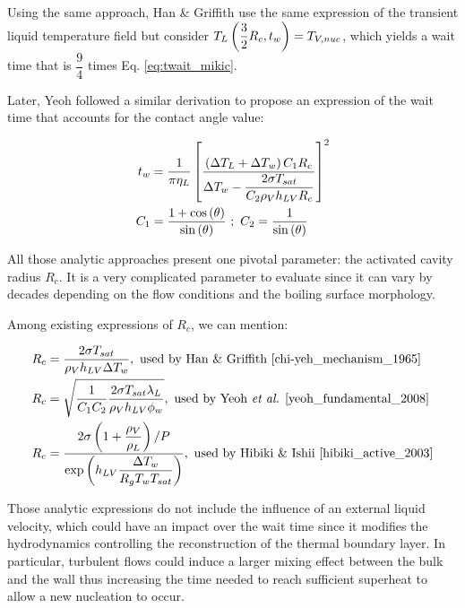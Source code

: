Using the same approach, Han \& Griffith \cite{chi-yeh_mechanism_1965} use the same expression of the transient liquid temperature field but consider $T_{L}\left( \dfrac{3}{2}R_{c},t_{w} \right)=T_{V,nuc}$, which yields a wait time that is $\dfrac{9}{4}$ times Eq. \ref{eq:twait_mikic}.

\npar

Later, Yeoh \etal \cite{yeoh_fundamental_2008} followed a similar derivation to propose an expression of the wait time that accounts for the contact angle value:

\begin{align}
t_{w} &= \frac{1}{\pi \eta_{L}}\crocht{ \frac{\parth{\Delta T_{L} + \Delta T_{w}} C_{1} R_{c}}{\Delta T_{w} - \dfrac{2\sigma T_{sat}}{C_{2}\rho_{V}h_{LV}R_{c}}}  }^{2}
\label{eq:twait_yeoh}\\
%
C_{1} &= \frac{1 + \cos{\theta} }{\sin{\theta}}\ ;\ C_{2} = \frac{1}{\sin{\theta}}
\end{align}

\npar

All those analytic approaches present one pivotal parameter: the activated cavity radius $R_{c}$. It is a very complicated parameter to evaluate since it can vary by decades depending on the flow conditions and the boiling surface morphology. 

\npar

Among existing expressions of $R_{c}$, we can mention:

\begin{align}
R_{c} &= \frac{2\sigma T_{sat}}{\rho_{V}h_{LV}\Delta T_{w}},\ \text{used by Han \& Griffith \cite{chi-yeh_mechanism_1965}}
\label{eq:rc_han}\\
%
R_{c} &= \sqrt{\dfrac{1}{C_{1}C_{2}} \dfrac{2 \sigma T_{sat} \lambda_{L}}{\rho_{V}h_{LV}\phi_{w}}}, \ \text{used by Yeoh \etal \cite{yeoh_fundamental_2008}}
\label{eq:rc_yeoh}\\
%
R_{c} &= \frac{2\sigma\parth{1+ \dfrac{\rho_{V}}{\rho_{L}} } / P}{\exp{h_{LV} \dfrac{\Delta T_{w}}{R_{g}T_{w}T_{sat}} }}, \ \text{used by Hibiki \& Ishii \cite{hibiki_active_2003}}
\label{eq:rc_hibiki}
\end{align}

\begin{remark*}{}
Those analytic expressions do not include the influence of an external liquid velocity, which could have an impact over the wait time since it modifies the hydrodynamics controlling the reconstruction of the thermal boundary layer. In particular, turbulent flows could induce a larger mixing effect between the bulk and the wall thus increasing the time needed to reach sufficient superheat to allow a new nucleation to occur.
\end{remark*}



